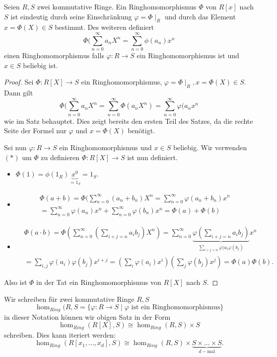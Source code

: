 \begin{theorem}
	Seien $R,S$ zwei kommutative Ringe. Ein Ringhomomorphismus $\Phi$ von $R[x]$ nach $S$ ist eindeutig durch seine Einschränkung
	$\varphi = \Phi \mid_{R}$ und durch das Element $x = \Phi(X) \in S$ bestimmt. Des weiteren definiert
	\[
		\Phi(\sum_{n=0}^{\infty} a_{n} X^{n} = \sum_{n=0}^{\infty} \phi(a_{n}) x^{n} \tag{$*$}
	\] 
	einen Ringhomomorphismus falls $\varphi: R \to S$ ein Ringhomomorphismus ist und $x \in S$ beliebig ist.
\end{theorem}

\begin{proof}
	Sei $\Phi: R[X] \to S$ ein Ringhomomorphismus, $\varphi = \Phi \mid_{R}, x = \Phi(X) \in S$.
	Dann gilt
	\[
		\Phi(\sum_{n=0}^{\infty} a_{n} X^{n} = \sum_{n=0}^{\infty} \Phi(a_{n} X^{n}) = \sum_{n=0}^{\infty} \varphi(a_{n} x^{n}
	\]
	wie im Satz behauptet. Dies zeigt bereits den ersten Teil des Satzes, da die rechte Seite der Formel nur $\varphi$ und $x = \Phi(X)$ benötigt.

	Sei nun $\varphi : R \to S$ ein Ringhomomorphismus und $x \in S$ beliebig.
	Wir verwenden $(*)$ um $\Phi$ zu definieren $\Phi: R[X] \to S$ ist nun definiert.
	\begin{itemize}
		\item $\Phi(1) = \phi(1_{R}) \underbrace{x^{0}}_{= 1_{S}} = 1_{S}$.
		\item \begin{align*}\Phi(a+b) = \Phi(\sum_{n=0}^{\infty} (a_{n} + b_{n}) X^{n} = \sum_{n=0}^{\infty} \varphi(a_{n}+b_{n}) x^{n}\\
			= \sum_{n=0}^{\infty} \varphi(a_{n}) x^{n} + \sum_{n=0}^{\infty} \varphi(b_{n}) x^{n}
			= \Phi(a) + \Phi(b)
		\end{align*}
	\item 
		\begin{align*}
			&\Phi(a\cdot b) = \Phi(\sum_{n=0}^{\infty} (\sum_{i+j=n} a_{i} b_{j}) X^{n} ) = 
			\sum_{n=0}^{\infty} \underbrace{\varphi(\sum_{i+j=n} a_{i} b_{j})}_{\sum_{i+j =n} \varphi(a_{i}\varphi(b_{j})} x^{n}\\
			&=\sum_{i,j} \varphi(a_{i}) \varphi(b_{j}) x^{i+j} 
			= (\sum_{i} \varphi(a_{i}) x^{i})(\sum_{j} \varphi(b_{j}) x^{j})
			= \Phi(a) \Phi(b)
		.\end{align*}
	\end{itemize}
	Also ist $\Phi$ in der Tat ein Ringhomomorphismus von $R[X]$ nach $S$.
\end{proof}

\begin{notation}
	Wir schreiben für zwei kommutative Ringe $R,S$ 
	\[
		\hom_{Ring}(R,S = \{ \varphi: R \to S \mid \varphi \text{ ist ein Ringhomomorphismus}\} 
	\] 
	in dieser Notation können wir obigen Satz in der Form
	\[
		\hom_{Ring}(R[X],S) \cong \hom_{Ring}(R,S) \times S
	\] 
	schreiben. Dies kann iteriert werden:
	\[
		\hom_{Ring} (R[x_1,\ldots,x_{d}],S) \cong \hom_{Ring}(R,S) \times \underbrace{S\times \ldots \times S}_{d-\text{mal}}
	.\] 
\end{notation}

